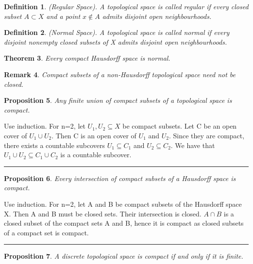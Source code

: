 \documentclass[twoside]{article}
\newcounter{lecnum}
\newtheorem{theorem}{Theorem}[lecnum]
\newtheorem{proposition}[theorem]{Proposition}
\newtheorem{definition}[theorem]{Definition}
\newtheorem{remark}[theorem]{Remark}
\newenvironment{proof}{{\bf Proof:}}{\hfill\rule{2mm}{2mm}}
\begin{document}
\begin{definition}(Regular Space). A topological space is called regular if every closed subset $A \subset X$ and a point $x \not \in A$ admits disjoint open neighbourhoods.
\end{definition}

\begin{definition}(Normal Space). A topological space is called normal if every disjoint nonempty closed subsets of X admits disjoint open neighbourhoods.
\end{definition}

\begin{theorem}Every compact Hausdorff space is normal.
\end{theorem}

\begin{remark}Compact subsets of a non-Hausdorff topological space need not be closed.
\end{remark}

\begin{proposition}Any finite union of compact subsets of a topological space is compact.
\end{proposition}

\begin{proof}Use induction. For n=2, let $U_1, U_2 \subseteq X$ be compact subsets. Let C be an open cover of $U_1 \cup U_2$. Then C is an open cover of $U_1$ and $U_2$. Since they are compact, there exists a countable subcovers $U_1 \subseteq C_1$ and $U_2 \subseteq C_2$. We have that $U_1 \cup U_2 \subseteq C_1 \cup C_2$ is a countable subcover. 
\end{proof}

\begin{proposition}Every intersection of compact subsets of a Hausdorff space is compact.
\end{proposition}

\begin{proof}Use induction. For n=2, let A and B be compact subsets of the Hausdorff space X. Then A and B must be closed sets. Their intersection is closed. $A \cap B$ is a closed subset of the compact sets A and B, hence it is compact as closed subsets of a compact set is compact.
\end{proof}


\begin{proposition}A discrete topological space is compact if and only if it is finite.
\end{proposition}
\end{document}
